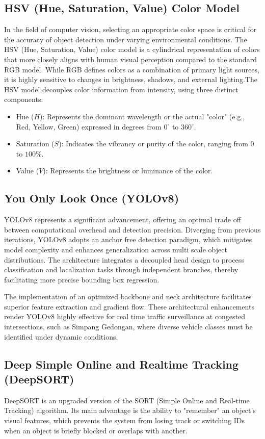 \documentclass[conference]{IEEEtran}
\begin{document}
\subsection{HSV (Hue, Saturation, Value) Color Model}
In the field of computer vision, selecting an appropriate color space is critical for the accuracy of object detection under varying environmental conditions. The HSV (Hue, Saturation, Value) color model is a cylindrical representation of colors that more closely aligns with human visual perception compared to the standard RGB model. While RGB defines colors as a combination of primary light sources, it is highly sensitive to changes in brightness, shadows, and external lighting.The HSV model decouples color information from intensity, using three distinct components:
\begin{itemize}
    \item Hue ($H$): Represents the dominant wavelength or the actual "color" (e.g., Red, Yellow, Green) expressed in degrees from $0^{\circ}$ to $360^{\circ}$.
    \item Saturation ($S$): Indicates the vibrancy or purity of the color, ranging from $0$ to $100\%$.
    \item Value ($V$): Represents the brightness or luminance of the color.
\end{itemize}

\subsection{You Only Look Once (YOLOv8)}
YOLOv8 represents a significant advancement, offering an optimal trade off between computational overhead and detection precision. Diverging from previous iterations, YOLOv8 adopts an anchor free detection paradigm, which mitigates model complexity and enhances generalization across multi scale object distributions. The architecture integrates a decoupled head design to process classification and localization tasks through independent branches, thereby facilitating more precise bounding box regression. 

The implementation of an optimized backbone and neck architecture facilitates superior feature extraction and gradient flow. These architectural enhancements render YOLOv8 highly effective for real time traffic surveillance at congested intersections, such as Simpang Gedongan, where diverse vehicle classes must be identified under dynamic conditions.
\subsection{Deep Simple Online and Realtime Tracking (DeepSORT)}
DeepSORT is an upgraded version of the SORT (Simple Online and Real-time Tracking) algorithm. Its main advantage is the ability to "remember" an object's visual features, which prevents the system from losing track or switching IDs when an object is briefly blocked or overlaps with another.
\end{document}
